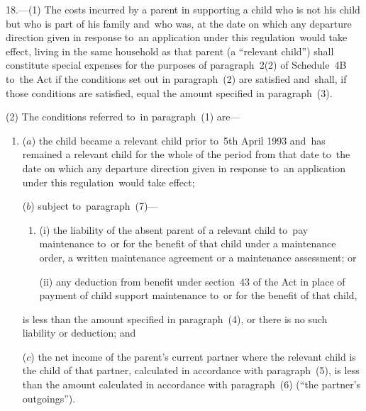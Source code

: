 \documentclass[12pt,a4paper]{article}
\begin{document}
18.—(1) The costs incurred by a parent in supporting a child who is not his child but who is part of his family 
and~who was, at the date on which any departure direction given in response to~an application under this regulation~would take effect, living in the same household as that parent  %
(a “relevant child”) shall constitute special expenses for the purposes of paragraph~2(2) of Schedule~4B to~the Act if the conditions set out in paragraph~(2) are satisfied and~shall, if those conditions are satisfied, equal the amount specified in paragraph~(3).

(2) The conditions referred to~in paragraph~(1) are—
\begin{enumerate}\item[]

($a$) the child became a relevant child prior to~5th April 1993 and~has remained a relevant child for the whole of the period from that date to~the date on which any departure direction given in response to~an application under this regulation~would take effect;


($b$) subject to~paragraph~(7)—
\begin{enumerate}\item[]
(i) the liability of the absent parent of a relevant child to~pay maintenance to~or for the benefit of that child under a maintenance order, a written maintenance agreement or a maintenance assessment; or

(ii) any deduction from benefit under section~43 of the Act in place of payment of child support maintenance to~or for the benefit of that child,
\end{enumerate}
is less than the amount specified in paragraph~(4), or there is no such liability or deduction; and

($c$) the net income of the parent’s current partner where the relevant child is
the child of that partner, calculated in accordance with paragraph~(5), is less
than the amount calculated in accordance with paragraph~(6) (“the partner’s
outgoings”).
\end{enumerate}
\end{document}
